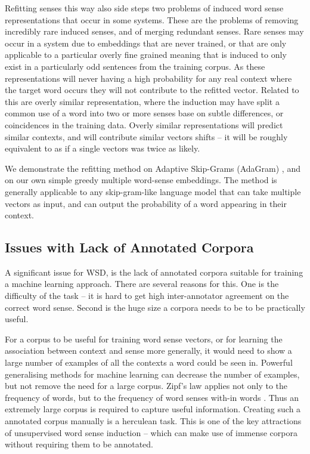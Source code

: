 \documentclass{sig-alternate}
\begin{document}
Refitting senses this way also side steps two problems of induced word sense representations that occur in some systems. These are the problems of removing incredibly rare induced senses, and of merging redundant senses.
Rare senses may occur in a system due to embeddings that are never trained, or that are only applicable to a particular overly fine grained meaning that is induced to only exist in a particularly odd sentences from the training corpus. As these representations will never having a high probability for any real context where the target word occurs they will not contribute to the refitted vector. Related to this are overly similar representation, where the induction may have split a common use of a word into two or more senses base on subtle differences, or coincidences in the training data. Overly similar representations will  predict similar contexts, and will contribute similar vectors shifts -- it will be roughly equivalent to as if a single vectors was twice as likely.


We demonstrate the refitting method on Adaptive Skip-Grams (AdaGram) \parencite{AdaGrams}, and on our own simple greedy multiple word-sense embeddings. The method is generally applicable to any skip-gram-like language model that can take multiple vectors as input, and can output the probability of a word appearing in their context.

\subsection{Issues with Lack of Annotated Corpora} \label{corpussize}
A significant issue for WSD, is the lack of annotated corpora suitable for training a machine learning approach.
There are several reasons for this. One is the difficulty of the task -- it is hard to get high inter-annotator agreement on the correct word sense. Second is the huge size a corpora needs to be to be practically useful.

For a corpus to be useful for training word sense vectors, or for learning the association between context and sense more generally, it would need to show a large number of examples of all the contexts a word could be seen in. Powerful generalising methods for machine learning can decrease the number of examples, but not remove the need for a large corpus. 
Zipf's law \parencite{zipf1949human} applies not only to the frequency of words, but to the frequency of word senses with-in words \parencite{Kilgarriff2004}. Thus an extremely large corpus is required to capture useful information. Creating such a annotated corpus manually is a herculean task. This is one of the key attractions of unsupervised word sense induction -- which can make use of immense corpora without requiring them to be annotated.
\end{document}
